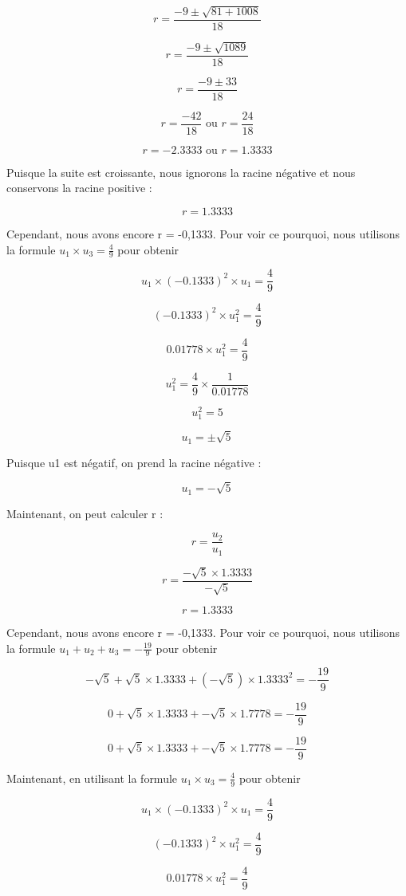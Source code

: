 \documentclass[11pt]{article}
\begin{document}
\[ r = \frac{-9 \pm \sqrt{81 + 1008}}{18} \]

\[ r = \frac{-9 \pm \sqrt{1089}}{18} \]

\[ r = \frac{-9 \pm 33}{18} \]

\[ r = \frac{-42}{18} \text{ ou } r = \frac{24}{18} \]

\[ r = -2.3333 \text{ ou } r = 1.3333 \]

Puisque la suite est croissante, nous ignorons la racine négative et nous conservons la racine positive :

\[ r = 1.3333 \]

Cependant, nous avons encore r = -0,1333. Pour voir ce pourquoi, nous utilisons la formule \( u_1 \times u_3 = \frac{4}{9} \) pour obtenir

\[ u_1 \times (-0.1333)^2 \times u_1 = \frac{4}{9} \]

\[ (-0.1333)^2 \times u_1^2 = \frac{4}{9} \]

\[ 0.01778 \times u_1^2 = \frac{4}{9} \]

\[ u_1^2 = \frac{4}{9} \times \frac{1}{0.01778} \]

\[ u_1^2 = 5 \]

\[ u_1 = \pm \sqrt{5} \]

Puisque u1 est négatif, on prend la racine négative :

\[ u_1 = -\sqrt{5} \]

Maintenant, on peut calculer r :

\[ r = \frac{u_2}{u_1} \]

\[ r = \frac{-\sqrt{5} \times 1.3333}{-\sqrt{5}} \]

\[ r = 1.3333 \]

Cependant, nous avons encore r = -0,1333. Pour voir ce pourquoi, nous utilisons la formule \( u_1 + u_2 + u_3 = -\frac{19}{9} \) pour obtenir

\[ -\sqrt{5} + \sqrt{5} \times 1.3333 + (-\sqrt{5}) \times 1.3333^2 = -\frac{19}{9} \]

\[ 0 + \sqrt{5} \times 1.3333 + -\sqrt{5} \times 1.7778 = -\frac{19}{9} \]

\[ 0 + \sqrt{5} \times 1.3333 + -\sqrt{5} \times 1.7778 = -\frac{19}{9} \]

Maintenant, en utilisant la formule \( u_1 \times u_3 = \frac{4}{9} \) pour obtenir

\[ u_1 \times (-0.1333)^2 \times u_1 = \frac{4}{9} \]

\[ (-0.1333)^2 \times u_1^2 = \frac{4}{9} \]

\[ 0.01778 \times u_1^2 = \frac{4}{9} \]
\end{document}
